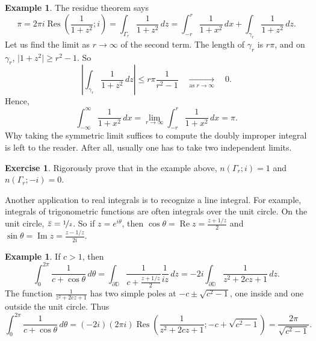 \documentclass[12pt,openany]{book}
\renewcommand{\Re}{\operatorname{Re}}
\renewcommand{\Im}{\operatorname{Im}}
\newcommand{\sabs}[1]{\lvert {#1} \rvert}
\newcommand{\abs}[1]{\left\lvert {#1} \right\rvert}
\newcommand{\D}{{\mathbb{D}}}
\theoremstyle{plain}
\theoremstyle{remark}
\theoremstyle{definition}
\newenvironment{exbox}{%
    \def\FrameCommand{\vrule width 1pt \relax\hspace{10pt}}%
    \MakeFramed{\advance\hsize-\width\FrameRestore}%
}{%
    \endMakeFramed
}
\theoremstyle{exercise}
\newtheorem{exercise}{Exercise}[section]
\theoremstyle{example}
\newtheorem{example}[thm]{Example}
\begin{document}
\begin{example}
The residue theorem says
\begin{equation*}
\pi 
=
2 \pi i \operatorname{Res}\left(\frac{1}{1+z^2};i\right) =
\int_{\Gamma_r} \frac{1}{1+z^2} \, dz
=
\int_{-r}^r \frac{1}{1+x^2} \, dx
+
\int_{\gamma_r} \frac{1}{1+z^2} \, dz .
\end{equation*}
Let us find the limit as $r \to \infty$ of the second term.
The length of $\gamma_r$ is $r\pi$,
and on $\gamma_r$,
$\sabs{1+z^2} \geq r^2-1$.  So
\begin{equation*}
\abs{
\int_{\gamma_r} \frac{1}{1+z^2} \, dz 
}
\leq
r \pi \frac{1}{r^2-1}
\quad\underset{\text{as } r \to \infty}{\to}\quad 0 .
\end{equation*}
Hence,
\begin{equation*}
\int_{-\infty}^\infty
\frac{1}{1+x^2} \, dx
=
\lim_{r\to \infty} \int_{-r}^r 
\frac{1}{1+x^2} \, dx
= \pi .
\end{equation*}
Why taking the symmetric limit suffices to compute the doubly improper
integral is left to the reader.  After all, usually one has to
take two independent limits.
\end{example}

\begin{exbox}
\begin{exercise}
Rigorously prove that in the example above,
$n(\Gamma_r;i) = 1$ and
$n(\Gamma_r;-i) = 0$.
\end{exercise}
\end{exbox}

Another application to real integrals is to recognize 
a line integral.  For example, integrals of trigonometric functions
are often integrals over the unit circle.  On the unit
circle, $\bar{z} = \nicefrac{1}{z}$.  So if $z=e^{i\theta}$, then
$\cos \theta = \Re z = \frac{z+1/z}{2}$ and
$\sin \theta = \Im z = \frac{z-1/z}{2i}$.

\begin{example}
If $c > 1$, then
\begin{equation*}
\int_0^{2\pi} \frac{1}{c+\cos \theta} \, d\theta 
=
\int_{\partial \D} \frac{1}{c+\frac{z+1/z}{2}} \frac{1}{iz} \, dz
=
-2i
\int_{\partial \D} \frac{1}{z^2 + 2cz + 1} \, dz
.
\end{equation*}
The function $\frac{1}{z^2 + 2cz + 1}$ has two simple poles at $-c \pm \sqrt{c^2-1}$,
one inside and one outside the unit circle.  Thus
\begin{equation*}
\int_0^{2\pi} \frac{1}{c+\cos \theta} \, d\theta 
=
(-2i)
(2 \pi i)
\operatorname{Res}
\left(\frac{1}{z^2 + 2cz + 1}; -c+\sqrt{c^2-1}\right)
=
\frac{2\pi}{\sqrt{c^2-1}}
.
\end{equation*}
\end{example}
\end{document}
